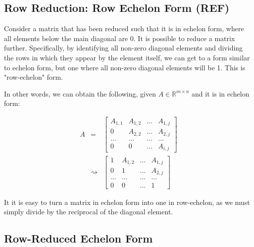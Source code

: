 \documentclass[12pt, a4paper]{article}
\begin{document}
\subsection{Row Reduction: Row Echelon Form (REF)}

Consider a matrix that has been reduced such that it is in echelon form, where all elements below the main diagonal are 0. 
It is possible to reduce a matrix further. Specifically, by identifying all non-zero diagonal elements and dividing the rows in which
they appear by the element itself, we can get to a form similar to echelon form, but one where all non-zero diagonal elements will be 1. 
This is "row-echelon" form.

In other words, we can obtain the following, given $ A \in \mathbb{R}^{m\times n} $ and it is in echelon form:

\begin{eqnarray*}
    A & = & \begin{bmatrix}
        A_{1,1}  & A_{1,2} & ... & A_{1,j}\\
        0 & A_{2,2} & ... & A_{2,j}\\
        ... & ... & ... & ... \\
        0 & 0 & ... & A_{i,j}
    \end{bmatrix} \\     
    & \rightsquigarrow & \begin{bmatrix}
        1  & A_{1,2} & ... & A_{1,j}\\
        0 & 1 & ... & A_{2,j}\\
        ... & ... & ... & ... \\
        0 & 0 & ... & 1
    \end{bmatrix}
\end{eqnarray*}

It it is easy to turn a matrix in echelon form into one in row-echelon, as we must simply divide by the reciprocal of the diagonal element.

\subsection{Row-Reduced Echelon Form}
\end{document}
